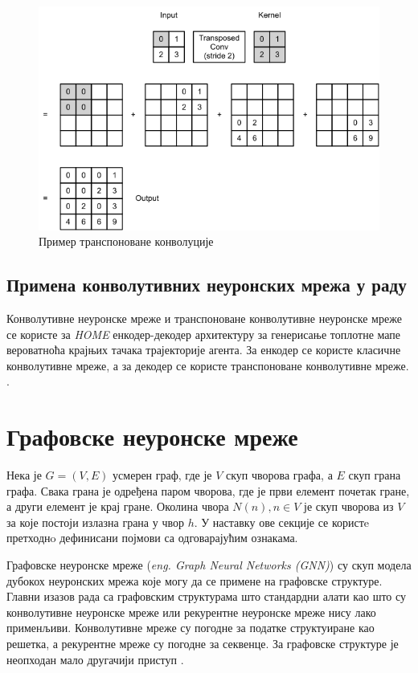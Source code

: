\documentclass[11pt,oneside]{memoir}
\begin{document}
\begin{figure}[H]
  \centering
  \includegraphics[width=1.0\textwidth]{images/transpose_cnn.png}
  \caption{Пример транспоноване конволуције \label{transpose-ccn}}
\end{figure}

\subsection{Примена конволутивних неуронских мрежа у раду}

Конволутивне неуронске мреже и транспоноване конволутивне неуронске мреже се користе за \textit{HOME} енкодер-декодер архитектуру за
генерисање топлотне мапе вероватноћа крајњих тачака трајекторије агента. За енкодер се користе класичне конволутивне мреже, а за
декодер се користе транспоноване конволутивне мреже. \cite{home}.

\section{Графовске неуронске мреже}

Нека је $G = (V, E)$ усмерен граф, где је $V$ скуп чворова графа, а $E$ скуп грана графа. Свака грана је одређена
паром чворова, где је први елемент почетак гране, а други елемент је крај гране. Околина чвора $N(n), n \in V$ је скуп чворова из $V$ 
за које постоји излазна грана у чвор $h$. У наставку ове секције се користe претходнo дефинисани појмови са одговарајућим ознакама.

Графовске неуронске мреже (\textit{eng. Graph Neural Networks (GNN)}) су скуп модела дубокох неуронских мрежа које могу да се примене на графовске структуре.
Главни изазов рада са графовским структурама што стандардни алати као што су конволутивне неуронске мреже или рекурентне неуронске мреже
нису лако применљиви. Конволутивне мреже су погодне за податке структуиране као решетка, а рекурентне мреже су погодне за секвенце. За 
графовске структуре је неопходан мало другачији приступ \cite{grl}. 
\end{document}
